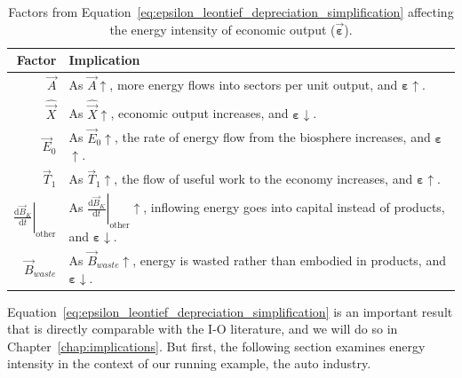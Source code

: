 \begin{table}
\caption[Factors affecting the energy intensity of economic output.]{Factors from
Equation~\ref{eq:epsilon_leontief_depreciation_simplification} 
affecting the energy intensity of economic output ($\vec{\bm{\varepsilon}}$).}
\begin{center}
  \begin{tabular}{r @{\hspace{2em}} l}
	  
    \toprule
	
    Factor & Implication \\ 
	
	\midrule
    
	$\vec{A}$ & As $\vec{A}$$\uparrow$, more energy 
	flows into sectors per unit output, 
	and $\bm{\varepsilon}$$\uparrow$.\\
	
	$\hat{\vec{X}}$ & As $\hat{\vec{X}}$$\uparrow$, economic output increases, 
	and $\bm{\varepsilon}$$\downarrow$.  \\
	
	$\vec{E}_{0}$ & As $\vec{E}_{0}$$\uparrow$, 
	the rate of energy flow from the biosphere increases, 
	and $\bm{\varepsilon}$$\uparrow$.  \\ 
	
	$\vec{T}_{1}$ & As $\vec{T}_{1}$$\uparrow$, 
	the flow of useful work to the economy increases, 
	and $\bm{\varepsilon}$$\uparrow$.  \\ 
	
	$\left. \frac{\mathrm{d}\vec{B}_{K}}{\mathrm{d}t} \right|_{\mathrm{other}}$ & 
	As $\left. \frac{\mathrm{d}\vec{B}_{K}}{\mathrm{d}t} \right|_{\mathrm{other}}$$\uparrow$, 
	inflowing energy goes into capital instead of products, 
	and $\bm{\varepsilon}$$\downarrow$. \\
	
	$\vec{B}_{waste}$ & As $\vec{B}_{waste}$$\uparrow$, 
	energy is wasted rather than embodied in products,
	and $\bm{\varepsilon}$$\downarrow$. \\

	\bottomrule
	
  \end{tabular}
\end{center}
\label{tab:embodied_energy_accumulation_factors}
\end{table}





Equation~\ref{eq:epsilon_leontief_depreciation_simplification}
is an important result that is directly comparable with the I-O literature,
and we will do so in Chapter~\ref{chap:implications}.
But first, the following section examines energy intensity 
in the context of our running example, the auto industry.

